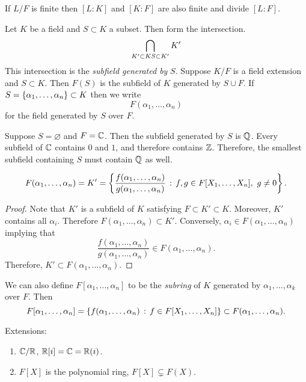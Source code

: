 \begin{cor}
	If $L / F$ is finite then $[L:K]$ and $[K:F]$ are also finite and divide $[L : F]$.
\end{cor}

\begin{dfn}
	Let $K$ be a field and $S \subset K$ a subset. Then form the intersection.
	\[
		\bigcap_{K' \subset K\\ S\subset K'} K'
	\]
	This intersection is the \emph{subfield generated by} $S$. Suppose $K / F$ is a field extension and $S \subset K$. Then $F(S)$ is the subfield of $K$ generated by $S \cup F$. If $S = \left\{\alpha_1, \ldots, \alpha_n\right\} \subset K$ then we write
	\[
		F(\alpha_1, \ldots, \alpha_n)
	\]
	for the field generated by $S$ over $F$.
\end{dfn}

\begin{eg}
	Suppose $S = \varnothing$ and $F = \mathbb{C}$. Then the subfield generated by $S$ is $\mathbb{Q}$. Every subfield of $\mathbb{C}$ contains $0$ and $1$, and therefore contains $\mathbb{Z}$. Therefore, the smallest subfield containing $S$ must contain $\mathbb{Q}$ as well.
\end{eg}

\begin{prop}
	\[
		F(\alpha_1, \ldots, \alpha_n) = K' = \left\{\frac{f(\alpha_1, \ldots, \alpha_n)}{g(\alpha_1, \ldots, \alpha_n)} \,:\, f,g \in F[X_1, \ldots, X_n],\ g \neq 0\right\}.
	\]
\end{prop}
\begin{proof}
	Note that $K'$ is a subfield of $K$ satisfying $F \subset K' \subset K$. Moreover, $K'$ contains all $\alpha_i$. Therefore $F(\alpha_1, \ldots,\alpha_n) \subset K'$. Conversely, $\alpha_i \in F(\alpha_1, \ldots, \alpha_n)$ implying that
	\[
		\frac{f(\alpha_1, \ldots, \alpha_n)}{g(\alpha_1, \ldots, \alpha_n)} \in F(\alpha_1, \ldots, \alpha_n).
	\]
	Therefore, $K' \subset F(\alpha_1, \ldots, \alpha_n)$.
\end{proof}

We can also define $F[\alpha_1, \ldots, \alpha_n]$ to be the \emph{subring} of $K$ generated by $\alpha_1, \ldots, \alpha_k$ over $F$. Then
\[
	F[\alpha_1, \ldots, \alpha_n] = \left\{f(\alpha_1, \ldots, \alpha_n) \,:\, f \in F[X_1, \ldots, X_n]\right\} \subset F(\alpha_1, \ldots, \alpha_n).
\]

\begin{eg}
	Extensions:
	\begin{enumerate}
		\item $\mathbb{C} / \mathbb{R}$, $\mathbb{R}[i] = \mathbb{C} = \mathbb{R}(i)$.
		\item $F[X]$ is the polynomial ring, $F[X] \subsetneq F(X)$.
	\end{enumerate}
\end{eg}

